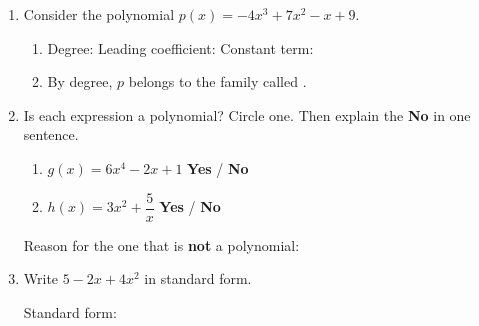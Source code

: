 \documentclass[10pt]{article}
\begin{document}

\vspace{0.12in}

\begin{enumerate}[itemsep=12pt]

\item Consider the polynomial $p(x) = -4x^3 + 7x^2 - x + 9$.

\vspace{0.06in}
\begin{enumerate}[label=(\alph*), itemsep=6pt]
  \item Degree: \blank{2.0cm} \qquad Leading coefficient: \blank{2.0cm}
        \qquad Constant term: \blank{2.0cm}
  \item By degree, $p$ belongs to the family called \blank{3.0cm}.
\end{enumerate}

\item Is each expression a polynomial? Circle one. Then explain the \textbf{No} in
      one sentence.

\begin{enumerate}[label=(\alph*), itemsep=6pt]
  \item $g(x) = 6x^4 - 2x + 1$ \quad \textbf{Yes} / \textbf{No}
  \item $h(x) = 3x^2 + \dfrac{5}{x}$ \quad \textbf{Yes} / \textbf{No}
\end{enumerate}

\vspace{0.06in}
Reason for the one that is \textbf{not} a polynomial:

\vspace{0.06in}
\writeline

\item Write $5 - 2x + 4x^2$ in standard form.

\vspace{0.1in}
Standard form: \blank{5cm}

\end{enumerate}
\end{document}

